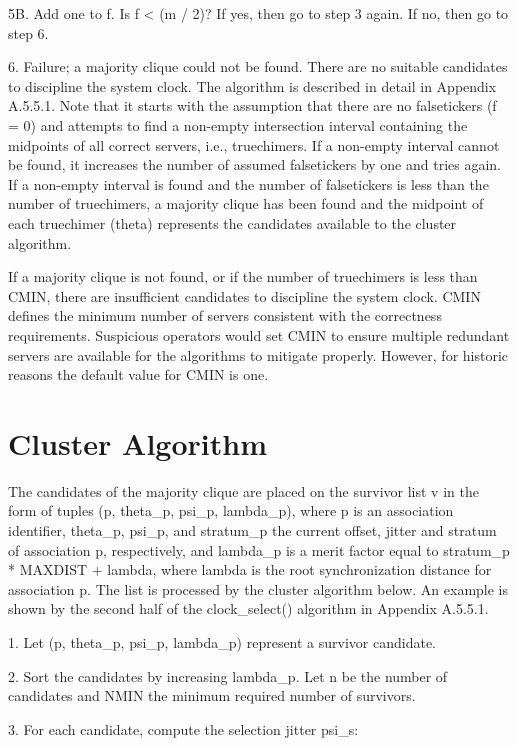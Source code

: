 5B. Add one to f.  Is f < (m / 2)?  If yes, then go to step 3 again.
If no, then go to step 6.

6.  Failure; a majority clique could not be found.  There are no
suitable candidates to discipline the system clock.
The algorithm is described in detail in Appendix A.5.5.1.  Note that
it starts with the assumption that there are no falsetickers (f = 0)
and attempts to find a non-empty intersection interval containing the
midpoints of all correct servers, i.e., truechimers.  If a non-empty
interval cannot be found, it increases the number of assumed
falsetickers by one and tries again.  If a non-empty interval is
found and the number of falsetickers is less than the number of
truechimers, a majority clique has been found and the midpoint of
each truechimer (theta) represents the candidates available to the
cluster algorithm.

If a majority clique is not found, or if the number of truechimers is
less than CMIN, there are insufficient candidates to discipline the
system clock.  CMIN defines the minimum number of servers consistent
with the correctness requirements.  Suspicious operators would set
CMIN to ensure multiple redundant servers are available for the
algorithms to mitigate properly.  However, for historic reasons the
default value for CMIN is one.

\section{Cluster Algorithm}

The candidates of the majority clique are placed on the survivor list
v in the form of tuples (p, theta\_p, psi\_p, lambda\_p), where p is an
association identifier, theta\_p, psi\_p, and stratum\_p the current
offset, jitter and stratum of association p, respectively, and
lambda\_p is a merit factor equal to stratum\_p * MAXDIST + lambda,
where lambda is the root synchronization distance for association p.
The list is processed by the cluster algorithm below.  An example is
shown by the second half of the clock\_select() algorithm in
Appendix A.5.5.1.

1.  Let (p, theta\_p, psi\_p, lambda\_p) represent a survivor candidate.

2.  Sort the candidates by increasing lambda\_p.  Let n be the number
of candidates and NMIN the minimum required number of survivors.

3.  For each candidate, compute the selection jitter psi\_s:

